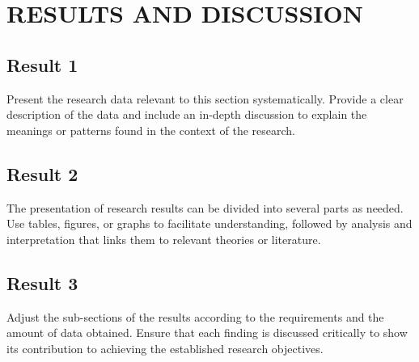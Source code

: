 \chapter{RESULTS AND DISCUSSION}

\section{Result 1}
Present the research data relevant to this section systematically. Provide a clear description of the data and include an in-depth discussion to explain the meanings or patterns found in the context of the research.

\section{Result 2}
The presentation of research results can be divided into several parts as needed. Use tables, figures, or graphs to facilitate understanding, followed by analysis and interpretation that links them to relevant theories or literature.

\section{Result 3}
Adjust the sub-sections of the results according to the requirements and the amount of data obtained. Ensure that each finding is discussed critically to show its contribution to achieving the established research objectives.
